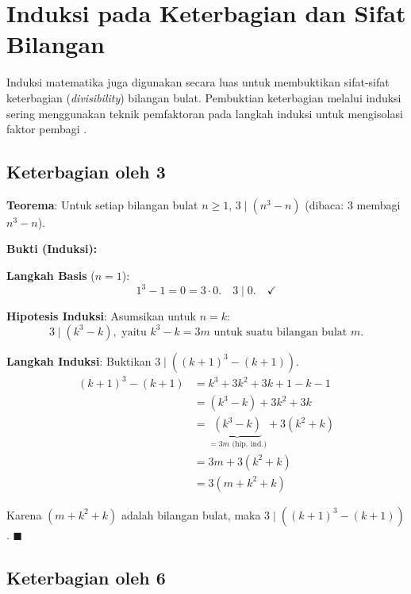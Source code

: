 \section{Induksi pada Keterbagian dan Sifat Bilangan}

Induksi matematika juga digunakan secara luas untuk membuktikan sifat-sifat keterbagian (\textit{divisibility}) bilangan bulat. Pembuktian keterbagian melalui induksi sering menggunakan teknik pemfaktoran pada langkah induksi untuk mengisolasi faktor pembagi \cite{rosen2019}.

\subsection{Keterbagian oleh 3}

\begin{contoh}
\textbf{Teorema}: Untuk setiap bilangan bulat $n \geq 1$, $3 \mid (n^3 - n)$ (dibaca: 3 membagi $n^3 - n$).

\textbf{Bukti (Induksi):}

\textbf{Langkah Basis} ($n = 1$):
\[ 1^3 - 1 = 0 = 3 \cdot 0. \quad 3 \mid 0. \quad \checkmark \]

\textbf{Hipotesis Induksi}: Asumsikan untuk $n = k$:
\[ 3 \mid (k^3 - k), \text{ yaitu } k^3 - k = 3m \text{ untuk suatu bilangan bulat } m. \]

\textbf{Langkah Induksi}: Buktikan $3 \mid ((k+1)^3 - (k+1))$.
\begin{align*}
(k+1)^3 - (k+1) &= k^3 + 3k^2 + 3k + 1 - k - 1 \\
&= (k^3 - k) + 3k^2 + 3k \\
&= \underbrace{(k^3 - k)}_{= 3m \text{ (hip. ind.)}} + 3(k^2 + k) \\
&= 3m + 3(k^2 + k) \\
&= 3(m + k^2 + k)
\end{align*}

Karena $(m + k^2 + k)$ adalah bilangan bulat, maka $3 \mid ((k+1)^3 - (k+1))$. $\blacksquare$
\end{contoh}

\subsection{Keterbagian oleh 6}

